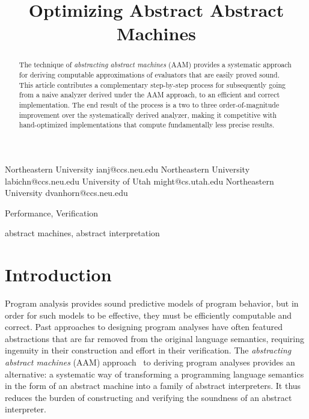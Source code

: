 \documentclass[9pt]{sigplanconf} %
\newcommand{\naive}{naive}
\begin{document}
\copyrightdata{[to be supplied]}


\title{Optimizing Abstract Abstract Machines}

           {Northeastern University}
           {ianj@ccs.neu.edu}
           {Northeastern University}
           {labichn@ccs.neu.edu}
           {University of Utah}
           {might@cs.utah.edu}
           {Northeastern University}
           {dvanhorn@ccs.neu.edu}
\maketitle

\begin{abstract}
The technique of \emph{abstracting abstract machines} (AAM) provides a systematic approach for deriving computable approximations of evaluators that are easily proved sound.
%
This article contributes a complementary step-by-step process for subsequently going from a \naive{} analyzer derived under the AAM approach, to an efficient and correct implementation.
%
The end result of the process is a two to three order-of-magnitude improvement over the systematically derived analyzer, making it competitive with hand-optimized implementations that compute fundamentally less precise results.
\end{abstract}


\terms
Performance, Verification

\keywords
abstract machines, abstract interpretation

\section{Introduction}

Program analysis provides sound predictive models of program behavior, but in order for such models to be effective, they must be efficiently computable and correct.
%
Past approaches to designing program analyses have often featured abstractions that are far removed from the original language semantics, requiring ingenuity in their construction and effort in their verification.
%
The \emph{abstracting abstract machines} (AAM) approach~\cite{dvanhorn:VanHorn2011Abstracting,dvanhorn:VanHorn2012Systematic} to deriving program analyses provides an alternative: a systematic way of transforming a programming language semantics in the form of an abstract machine into a family of abstract interpreters.
%
It thus reduces the burden of constructing and verifying the soundness of an abstract interpreter.
%
\end{document}
